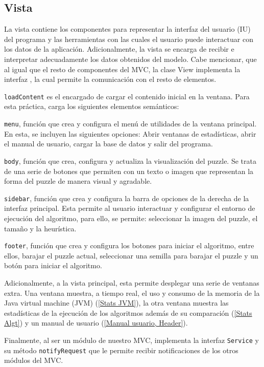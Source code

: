 \subsection{Vista}

La vista contiene los componentes para representar la interfaz del usuario (IU) del programa y las herramientas con las cuales el usuario puede interactuar con los datos de la aplicación. Adicionalmente, la vista se encarga de recibir e interpretar adecuadamente los datos obtenidos del modelo. Cabe mencionar, que al igual que el resto de componentes del MVC, la clase View implementa la interfaz , la cual permite la comunicación con el resto de elementos.\bigskip

\texttt{loadContent} es el encargado de cargar el contenido inicial en la ventana. Para esta práctica, carga los siguientes elementos semánticos:\bigskip

\texttt{menu}, función que crea y configura el menú de utilidades de la ventana principal. En esta, se incluyen las siguientes opciones: Abrir ventanas de estadísticas, abrir el manual de usuario, cargar la base de datos y salir del programa.\bigskip

\texttt{body}, función que crea, configura y actualiza la visualización del puzzle. Se trata de una serie de botones que permiten con un texto o imagen que representan la forma del puzzle de manera visual y agradable.\bigskip

\texttt{sidebar}, función que crea y configura la barra de opciones de la derecha de la interfaz principal. Esta permite al usuario interactuar y configurar el entorno de ejecución del algoritmo, para ello, se permite: seleccionar la imagen del puzzle, el tamaño y la heurística.\bigskip

\texttt{footer}, función que crea y configura los botones para iniciar el algoritmo, entre ellos, barajar el puzzle actual, seleccionar una semilla para barajar el puzzle y un botón para iniciar el algoritmo.\bigskip

Adicionalmente, a la vista principal, esta permite desplegar una serie de ventanas extra. Una ventana muestra, a tiempo real, el uso y consumo de la memoria de la Java virtual machine (JVM) (\ref{Stats JVM}), la otra ventana muestra las estadísticas de la ejecución de los algoritmos además de su comparación (\ref{Stats Algt}) y un manual de usuario (\ref{Manual usuario, Header}).\bigskip

Finalmente, al ser un módulo de nuestro MVC, implementa la interfaz \texttt{Service} y su método \texttt{notifyRequest} que le permite recibir notificaciones de los otros módulos del MVC.


